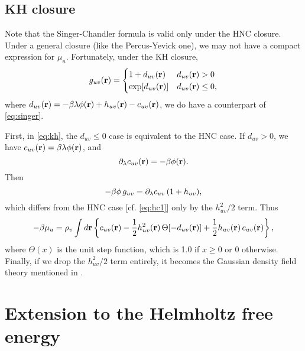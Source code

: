 \documentclass[12pt]{article}
\begin{document}
\subsection{KH closure}

Note that the Singer-Chandler formula is valid
  only under the HNC closure.
Under a general closure (like the Percus-Yevick one),
  we may not have a compact expression for $\mu_u$.
Fortunately, under the KH closure,
\begin{equation}
  g_{uv}(\mathbf{r}) =
  \begin{cases}
    1 + d_{uv}(\mathbf{r})
    & d_{uv}(\mathbf{r}) > 0
  \\
    \exp[ d_{uv}(\mathbf{r}) ]
    & d_{uv}(\mathbf{r}) \le 0,
  \end{cases}
  \label{eq:kh}
\end{equation}
where $d_{uv}(\mathbf{r}) = -\beta \lambda \phi(\mathbf{r}) + h_{uv}(\mathbf{r}) - c_{uv}(\mathbf{r})$,
we do have a counterpart of \eqref{eq:singer}.


First, in \eqref{eq:kh}, the $d_{uv} \le 0$ case is equivalent to the HNC case.
%
If $d_{uv} > 0$, we have $c_{uv}(\mathbf{r}) = \beta \lambda \phi(\mathbf{r})$, and
\[
  \partial_\lambda c_{uv}(\mathbf{r}) = -\beta \phi(\mathbf{r}).
\]
Then
\[
  -\beta \phi \, g_{uv}
  = \partial_\lambda c_{uv} \, (1 + h_{uv}),
\]
which differs from the HNC case [cf. \eqref{eq:hc1}]
  only by the $h_{uv}^2/2$ term.
Thus
%
\begin{equation}
-\beta \mu_u
  =
  \rho_v \int d\mathbf{r}
  \left\{
    c_{uv}(\mathbf{r})
    - \frac{1}{2} h_{uv}^2(\mathbf{r}) \, \Theta[ -d_{uv}(\mathbf{r}) ]
    + \frac{1}{2} h_{uv}(\mathbf{r}) \, c_{uv}(\mathbf{r})
  \right\},
  \label{eq:singer-kh}
\end{equation}
%
where $\Theta(x)$ is the unit step function,
which is 1.0 if $x \ge 0$ or 0 otherwise.
%
Finally, if we drop the $h_{uv}^2/2$ term entirely,
it becomes the Gaussian density field theory mentioned in \cite{singer}.



\section{Extension to the Helmholtz free energy}
\end{document}
